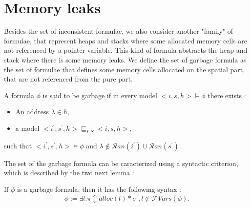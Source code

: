 \documentclass[a4paper,twoside,12pt]{report}
\newcommand{\Alloc}[1]{alloc(#1)}
\newcommand{\Unsep}[0]{\ast}
\newcommand{\Sep}[2]{#1 \Unsep #2}
\newcommand{\Formula}[2]{ #1  \updownarrow #2}
\newcommand{\Ran}[1]{\mathcal{R}an(#1)}
\newcommand{\FVars}[1]{\mathcal{F}Vars(#1)}
\newcommand{\ModOrderIeq}[0]{\sqsubseteq_{I,S}}
\begin{document}
\section{Memory leaks}

Besides the set of inconsistent formulae, we also consider another "family" of formulae,
that represent heaps and stacks where some allocated memory cells are not referenced by a pointer variable. This kind of formula abstracts the heap and stack where
there is some memory leaks. We define the set of garbage formula as the set
of formulae that defines some memory cells allocated on the spatial part, that
are not referenced from the pure part. 


\begin{definition}
\label{def:garbageformula}
A formula $\phi$ is said to be garbage if in every model $<i,s,h>\models \phi$
there exists :
\begin{itemize} 
\item An address $\lambda \in h$,
\item a model $<i^{\prime},s^{\prime},h> \ModOrderIeq <i,s,h>$,
\end{itemize}
 such that $<i^{\prime},s^{\prime},h>\models \phi$ and $\lambda \not\in \Ran{i^{\prime}}\cup\Ran{s^{\prime}}$.
\end{definition}

The set of the garbage formula can be caracterized using a syntactic criterion, which is described by the two next lemma :

\begin{lemma}
\label{lemma:garbagebasic}
If $\phi$ is a garbage formula, then
it has the following syntax :
$$\phi:= \exists l. \Formula{\pi}{\Sep{\Alloc{l}}{\sigma^{\prime}}}, l\not\in \FVars{\phi}.$$
\end{lemma}
\end{document}
